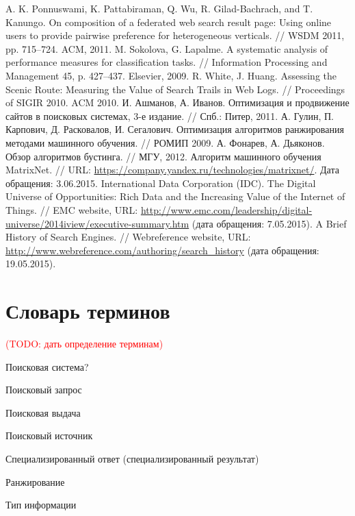 \documentclass[12pt,a4paper]{report}
\newcommand\note[1]{\textcolor{red}{(#1)}}
\newcommand\todonote[1]{\note{TODO: #1}}
\begin{document}
\begin{thebibliography}{@}
   A. K. Ponnuswami, K. Pattabiraman, Q. Wu,
R. Gilad-Bachrach, and T. Kanungo. On composition of a federated web search result page: Using online users to provide pairwise preference for heterogeneous verticals. //  WSDM 2011, pp. 715–724. ACM, 2011.
   M. Sokolova, G. Lapalme. A systematic analysis of performance measures for classification tasks. // Information Processing and Management 45, p. 427–437. Elsevier, 2009.
   R. White, J. Huang. Assessing the Scenic Route: Measuring the Value of Search Trails in Web Logs. // Proceedings of SIGIR 2010. ACM 2010.    
 И. Ашманов, А. Иванов. Оптимизация и продвижение сайтов в поисковых системах, 3-е издание. // Спб.: Питер, 2011.
   А. Гулин, П. Карпович, Д. Расковалов,
И. Сегалович. Оптимизация алгоритмов ранжирования методами машинного обучения. // РОМИП 2009.
   А. Фонарев, А. Дьяконов. Обзор алгоритмов бустинга. // МГУ, 2012.
   Алгоритм машинного обучения MatrixNet. // URL: \url{https://company.yandex.ru/technologies/matrixnet/}. Дата обращения: 3.06.2015.               
 International Data Corporation (IDC). The Digital Universe of Opportunities: Rich Data and the Increasing Value of the Internet of Things. // EMC website,
  URL: \url{http://www.emc.com/leadership/digital-universe/2014iview/executive-summary.htm} (дата обращения: 7.05.2015).
 A Brief History of Search Engines. // Webreference website, 
  URL: \url{http://www.webreference.com/authoring/search_history} (дата обращения: 19.05.2015).

\end{thebibliography}

\chapter*{Словарь терминов}

\todonote{дать определение терминам}

Поисковая система?

Поисковый запрос

Поисковая выдача


Поисковый источник

Специализированный ответ (специализированный результат)

Ранжирование

Тип информации
\end{document}
